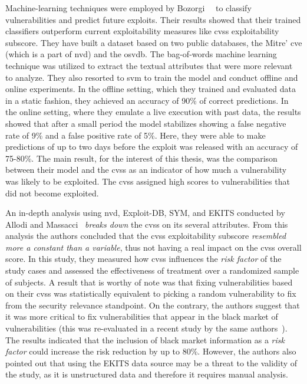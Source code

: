 Machine-learning techniques were employed by Bozorgi~\etal{}~\cite{Bozorgi:2010} to classify vulnerabilities and predict future exploits.
Their results showed that their trained classifiers outperform current exploitability measures like \gls{cvss} exploitability subscore.
They have built a dataset based on two public databases, the Mitre' \gls{cve} (which is a part of \gls{nvd}) and the \gls{osvdb}.
The bag-of-words machine learning technique was utilized to extract the textual attributes that were more relevant to analyze.
They also resorted to \gls{svm} to train the model and conduct offline and online experiments.
In the offline setting, which they trained and evaluated data in a static fashion, they achieved an accuracy of 90\% of correct predictions.
In the online setting, where they emulate a live execution with past data, the results showed that after a small period the model stabilizes showing a false negative rate of 9\% and a false positive rate
of 5\%.
Here, they were able to make predictions of up to two days before the exploit was released with an accuracy of 75-80\%.
The main result, for the interest of this thesis, was the comparison between their model and the \gls{cvss} as an indicator of how much a vulnerability was likely to be exploited.
The \gls{cvss} assigned high scores to vulnerabilities that did not become exploited. 


An in-depth analysis using \gls{nvd}, Exploit-DB, SYM, and EKITS conducted by Allodi and Massacci~\cite{Allodi:2014} \emph{breaks down} the \gls{cvss} on its several attributes.
From this analysis the authors concluded that the \gls{cvss} exploitability subscore \emph{resembled more a constant than a variable}, thus not having a real impact on the \gls{cvss} overall score.
In this study, they measured how \gls{cvss} influences the \emph{risk factor} of the study cases and assessed the effectiveness of treatment over a randomized sample of subjects.
A result that is worthy of note was that fixing vulnerabilities based on their \gls{cvss} was statistically equivalent to picking a random vulnerability to fix from the security relevance standpoint.
On the contrary, the authors suggest that it was more critical to fix vulnerabilities that appear in the black market of vulnerabilities (this was re-evaluated in a recent study by the same authors~\cite{Allodi:2017}).
The results indicated that the inclusion of black market information as a \emph{risk factor} could increase the risk reduction by up to 80\%.
However, the authors also pointed out that using the EKITS data source may be a threat to the validity of the study, as it is unstructured data and therefore it requires manual analysis.



